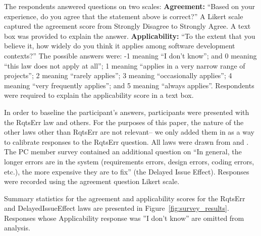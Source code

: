 \documentclass[smallcondesed]{svjour3}
\begin{document}
The respondents answered questions on two scales: \newline
\textbf{Agreement:} ``Based on your experience, do you agree that the statement above is correct?'' A Likert scale captured the agreement score from Strongly Disagree to Strongly Agree. A text box was provided to explain the answer. \newline
\textbf{Applicability:} ``To the extent that you believe it, how widely do you think it applies among software development contexts?'' The possible answers were: 
-1 meaning ``I don't know''; and 0 meaning ``this law does not apply at all'';
 1 meaning ``applies in a very narrow range of projects'';  2 meaning
``rarely applies'';   3 meaning
``occasionally applies'';  
4 meaning ``very frequently applies''; and
 5 meaning ``always applies''.
Respondents were required to explain the applicability score in a text box.

In order to baseline the participant's answers, participants were presented with the RqtsErr law and others. For the purposes
of this paper, the nature of the other laws other than RqtsErr are not relevant-- we
only added them in as a way to calibrate responses to the RqtsErr question. All laws were drawn from \cite{glass02} and \cite{endres03}. 
The PC member survey contained an additional question on ``In general, the longer errors are in the system (requirements errors, design errors, coding errors, etc.), the more expensive they are to fix'' (the Delayed Issue Effect). Responses were recorded using the agreement question Likert scale. 

Summary statistics for the agreement and applicability scores for the RqtsErr and DelayedIssueEffect laws are presented in Figure~\ref{fig:survey_results}. Responses whose Applicability response was ''I don't know'' are omitted from analysis.
\end{document}
